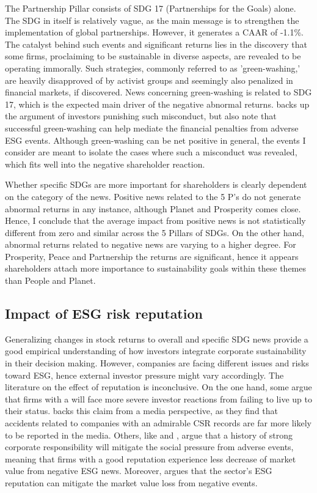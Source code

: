The Partnership Pillar consists of SDG 17 (Partnerships for the Goals) alone. The SDG in itself is relatively vague, as the main message is to strengthen the implementation of global partnerships. However, it generates a CAAR of -1.1\%. The catalyst behind such events and significant returns lies in the discovery that some firms, proclaiming to be sustainable in diverse aspects, are revealed to be operating immorally. Such strategies, commonly referred to as 'green-washing,' are heavily disapproved of by activist groups and seemingly also penalized in financial markets, if discovered. News concerning green-washing is related to SDG 17, which is the expected main driver of the negative abnormal returns. \cite{Blancard_ESG_sentiment} backs up the argument of investors punishing such misconduct, but also note that successful green-washing can help mediate the financial penalties from adverse ESG events. Although green-washing can be net positive in general, the events I consider are meant to isolate the cases where such a misconduct was revealed, which fits well into the negative shareholder reaction.   

Whether specific SDGs are more important for shareholders is clearly dependent on the category of the news. Positive news related to the 5 P's do not generate abnormal returns in any instance, although Planet and Prosperity comes close. Hence, I conclude that the average impact from positive news is not statistically different from zero and similar across the 5 Pillars of SDGs. On the other hand, abnormal returns related to negative news are varying to a higher degree. For Prosperity, Peace and Partnership the returns are significant, hence it appears shareholders attach more importance to sustainability goals within these themes than People and Planet.    



\subsection{Impact of ESG risk reputation}

Generalizing changes in stock returns to overall and specific SDG news provide a good empirical understanding of how investors integrate corporate sustainability in their decision making. However, companies are facing different issues and risks toward ESG, hence external investor pressure might vary accordingly. 
The literature on the effect of reputation is inconclusive. On the one hand, some argue that firms with a  will face more severe investor reactions from failing to live up to their status. \cite{noNewsgoodnews} backs this claim from a media perspective, as they find that accidents related to companies with an admirable CSR records are far more likely to be reported in the media. Others, like \cite{flammer2013corporate} and \cite{godfrey2009relationship}, argue that a history of strong corporate responsibility will mitigate the social pressure from adverse events, meaning that firms with a good reputation experience less decrease of market value from negative ESG news. Moreover, \cite{Blancard_ESG_sentiment} argues that the sector's ESG reputation can mitigate the market value loss from negative events.  

